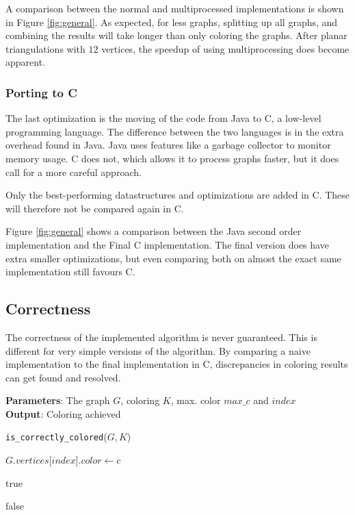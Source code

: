 \documentclass{article}
\begin{document}
A comparison between the normal and multiprocessed implementations is shown in Figure \ref{fig:general}. As expected, for less graphs, splitting up all graphs, and combining the results will take longer than only coloring the graphs. After planar triangulations with $12$ vertices, the speedup of using multiprocessing does become apparent. 

\subsubsection{Porting to C}

The last optimization is the moving of the code from Java to C, a low-level programming language. The difference between the two languages is in the extra overhead found in Java. Java uses features like a garbage collector to monitor memory usage. C does not, which allows it to process graphs faster, but it does call for a more careful approach.

Only the best-performing datastructures and optimizations are added in C. These will therefore not be compared again in C.

Figure \ref{fig:general} shows a comparison between the Java second order implementation and the Final C implementation. The final version does have extra smaller optimizations, but even comparing both on almost the exact same implementation still favours C.


\subsection{Correctness}
\label{sec:correctness}

The correctness of the implemented algorithm is never guaranteed. This is different for very simple versions of the algorithm. By comparing a naive implementation to the final implementation in C, discrepancies in coloring results can get found and resolved. 

\begin{algorithm}[tb]
	\caption{\texttt{can\_color\_with\_max\_c\_naive}}
	\label{alg:naive}
	\textbf{Parameters}: The graph $G$, coloring $K$, max. color $max\_c$ and $index$ \\
	\textbf{Output}: Coloring achieved
	\begin{algorithmic}[1]
		
		\RETURN \texttt{is\_correctly\_colored}($G, K$)
		\ENDIF
		
		
		\STATE $G.vertices$[$index$]$.color \gets c$
		
		
		\RETURN true
		
		\ENDIF
		
		\ENDFOR
		
		\RETURN false
	\end{algorithmic}
\end{algorithm}
\end{document}
